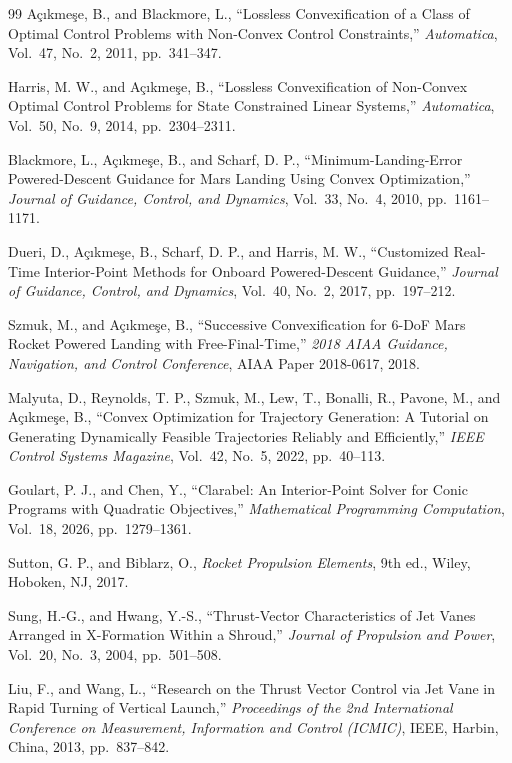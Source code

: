 \documentclass[10pt,letterpaper]{article}
\begin{document}
\begin{thebibliography}{99}
A\c{c}{\i}kme\c{s}e, B., and Blackmore, L., ``Lossless Convexification of a Class of Optimal Control Problems with Non-Convex Control Constraints,'' \textit{Automatica}, Vol.~47, No.~2, 2011, pp.~341--347.

Harris, M. W., and A\c{c}{\i}kme\c{s}e, B., ``Lossless Convexification of Non-Convex Optimal Control Problems for State Constrained Linear Systems,'' \textit{Automatica}, Vol.~50, No.~9, 2014, pp.~2304--2311.

Blackmore, L., A\c{c}{\i}kme\c{s}e, B., and Scharf, D. P., ``Minimum-Landing-Error Powered-Descent Guidance for Mars Landing Using Convex Optimization,'' \textit{Journal of Guidance, Control, and Dynamics}, Vol.~33, No.~4, 2010, pp.~1161--1171.

Dueri, D., A\c{c}{\i}kme\c{s}e, B., Scharf, D. P., and Harris, M. W., ``Customized Real-Time Interior-Point Methods for Onboard Powered-Descent Guidance,'' \textit{Journal of Guidance, Control, and Dynamics}, Vol.~40, No.~2, 2017, pp.~197--212.

Szmuk, M., and A\c{c}{\i}kme\c{s}e, B., ``Successive Convexification for 6-DoF Mars Rocket Powered Landing with Free-Final-Time,'' \textit{2018 AIAA Guidance, Navigation, and Control Conference}, AIAA Paper 2018-0617, 2018.

Malyuta, D., Reynolds, T. P., Szmuk, M., Lew, T., Bonalli, R., Pavone, M., and A\c{c}{\i}kme\c{s}e, B., ``Convex Optimization for Trajectory Generation: A Tutorial on Generating Dynamically Feasible Trajectories Reliably and Efficiently,'' \textit{IEEE Control Systems Magazine}, Vol.~42, No.~5, 2022, pp.~40--113.

Goulart, P. J., and Chen, Y., ``Clarabel: An Interior-Point Solver for Conic Programs with Quadratic Objectives,'' \textit{Mathematical Programming Computation}, Vol.~18, 2026, pp.~1279--1361.

Sutton, G. P., and Biblarz, O., \textit{Rocket Propulsion Elements}, 9th ed., Wiley, Hoboken, NJ, 2017.

Sung, H.-G., and Hwang, Y.-S., ``Thrust-Vector Characteristics of Jet Vanes Arranged in X-Formation Within a Shroud,'' \textit{Journal of Propulsion and Power}, Vol.~20, No.~3, 2004, pp.~501--508.

Liu, F., and Wang, L., ``Research on the Thrust Vector Control via Jet Vane in Rapid Turning of Vertical Launch,'' \textit{Proceedings of the 2nd International Conference on Measurement, Information and Control (ICMIC)}, IEEE, Harbin, China, 2013, pp.~837--842.


\end{thebibliography}
\end{document}
